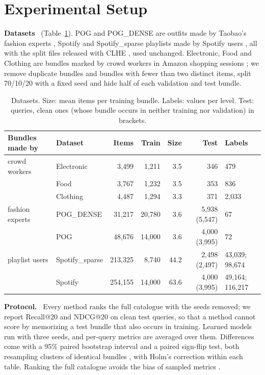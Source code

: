 \documentclass[runningheads]{llncs}
\renewcommand{\paragraph}[1]{\smallskip\noindent\textbf{#1}\ }
\begin{document}
\section{Experimental Setup}

\paragraph{Datasets} (Table~\ref{tab:data}). POG and POG\_DENSE are outfits made by Taobao's fashion experts
\cite{pog}, Spotify and Spotify\_sparse playlists made by Spotify users \cite{spotify}, all with the split files
released with CLHE \cite{clhe}, used unchanged. Electronic, Food and Clothing are bundles marked by crowd workers in
Amazon shopping sessions \cite{bundlerec}; we remove duplicate bundles and bundles with fewer than two distinct items,
split 70/10/20 with a fixed seed and hide half of each validation and test bundle.

\begin{table}[t]
\centering
\caption{Datasets. Size: mean items per training bundle. Labels: values per level. Test: queries, clean ones (whose
bundle occurs in neither training nor validation) in brackets.}
\label{tab:data}
\setlength{\tabcolsep}{3pt}
\scriptsize
\begin{tabular}{llrrrrl}
\toprule
Bundles made by & Dataset & Items & Train & Size & Test & Labels\\
\midrule
crowd workers & Electronic & 3,499 & 1,211 & 3.5 & 346 & 479\\
 & Food & 3,767 & 1,232 & 3.5 & 353 & 836\\
 & Clothing & 4,487 & 1,294 & 3.3 & 371 & 2,033\\
fashion experts & POG\_DENSE & 31,217 & 20,780 & 3.6 & 5,938 (5,547) & 67\\
 & POG & 48,676 & 14,000 & 3.6 & 4,000 (3,995) & 72\\
playlist users & Spotify\_sparse & 213,325 & 8,740 & 44.2 & 2,498 (2,497) & 43,039; 98,674\\
 & Spotify & 254,155 & 14,000 & 63.6 & 4,000 (3,995) & 49,164; 116,217\\
\bottomrule
\end{tabular}
\end{table}

\paragraph{Protocol.} Every method ranks the full catalogue with the seeds removed; we report Recall@20 and NDCG@20 on
clean test queries, so that a method cannot score by memorizing a test bundle that also occurs in training. Learned models run with three seeds, and per-query metrics are averaged over them.
Differences come with a 95\% paired bootstrap interval and a paired sign-flip test, both resampling clusters of
identical bundles \cite{efron1993,smucker2007}, with Holm's correction \cite{holm1979} within each table. Ranking the
full catalogue avoids the bias of sampled metrics \cite{krichene2020}.
\end{document}

